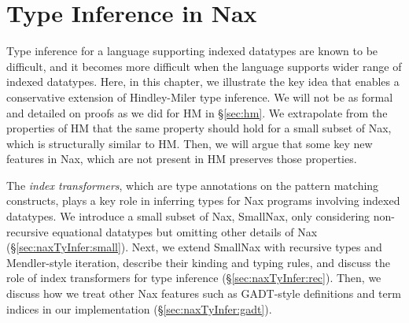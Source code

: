 \chapter{Type Inference in Nax} \label{ch:naxTyInfer}
Type inference for a language supporting indexed datatypes are
known to be difficult, and it becomes more difficult when the language
supports wider range of indexed datatypes. Here, in this chapter, we
illustrate the key idea that enables a conservative extension of
Hindley-Miler type inference. We will not be as formal and detailed
on proofs as we did for HM in \S\ref{sec:hm}. We extrapolate from
the properties of HM that the same property should hold for
a small subset of Nax, which is structurally similar to HM.
Then, we will argue that some key new features in Nax, which are
not present in HM preserves those properties.

The \emph{index transformers}, which are type annotations on
the pattern matching constructs, plays a key role in inferring types for
Nax programs involving indexed datatypes. We introduce a small subset of Nax,
SmallNax, only considering non-recursive equational datatypes but omitting
other details of Nax (\S\ref{sec:naxTyInfer:small}). Next, we extend SmallNax
with recursive types and Mendler-style iteration, describe their kinding and
typing rules, and discuss the role of index transformers for type inference
(\S\ref{sec:naxTyInfer:rec}). Then, we discuss how we treat other Nax features
such as GADT-style definitions and term indices in our implementation
(\S\ref{sec:naxTyInfer:gadt}).

